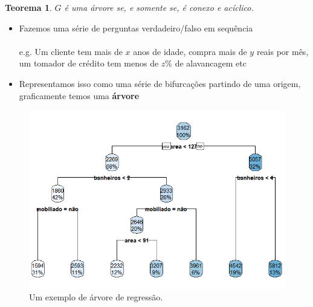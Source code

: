 \documentclass{beamer} %
\newtheorem{teo}{Teorema}
\newcommand{\1}{\mathbb{I}}
\begin{document}
\begin{frame}
    \begin{teo}
$G$ é uma árvore se, e somente se, é conexo e acíclico.
\end{teo}
\end{frame}



\begin{frame}


\begin{itemize}
    \item Fazemos uma série de perguntas verdadeiro/falso em sequência 
    \\
    \\
    e.g. Um cliente tem mais de $x$ anos de idade, compra mais de $y$ reais por mês, um tomador de crédito tem menos de $z\%$ de alavancagem etc
    \item Representamos isso como uma série de bifurcações partindo de uma origem, graficamente temos uma \textbf{árvore}

\end{itemize}
\end{frame}


\begin{frame}

\begin{figure}[H]
    \centering
    \includegraphics[scale = .55]{imagens/arvore_decisao_houses.png}
    \caption{Um exemplo de árvore de regressão.}
    \label{fig:arvore_reg}
\end{figure}
\end{frame}
\end{document}
